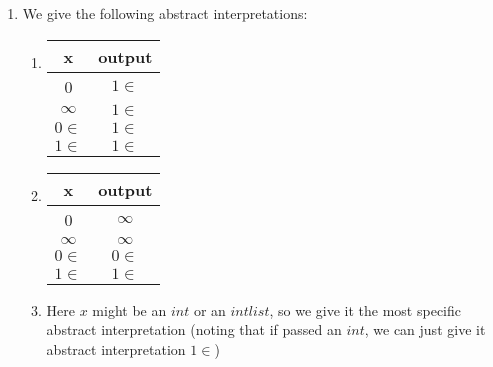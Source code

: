 \begin{enumerate}[label=(\alph*)]
\begin{enumerate}[label=(\roman*)]
        \end{enumerate}

    \item
        We give the following abstract interpretations:

        \begin{enumerate}[label=(\roman*)]

            \item
                \begin{tabular}{cc}
                    x&output\\
                    \hline
                    0&$1\in$\\
                    $\infty$&$1\in$\\
                    $0\in$&$1\in$\\
                    $1\in$&$1\in$\\
                \end{tabular}

            \item
                \begin{tabular}{cc}
                    x&output\\
                    \hline
                    0&$\infty$\\
                    $\infty$&$\infty$\\
                    $0\in$&$0\in$\\
                    $1\in$&$1\in$\\
                \end{tabular}

            \item
                Here $x$ might be an $int$ or an $int list$, so we give it the most specific abstract interpretation (noting that if passed an $int$, we can just give it abstract interpretation $1\in$)


\end{enumerate}
\end{enumerate}
